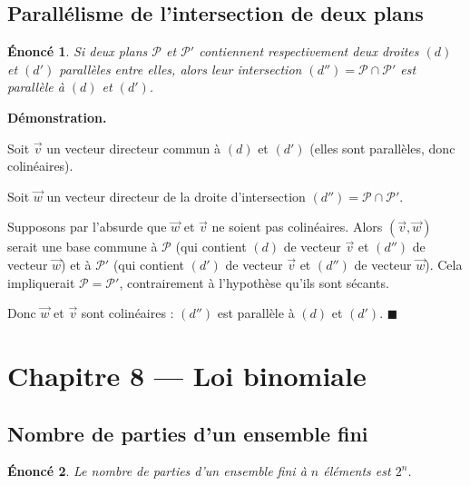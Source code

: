 \documentclass[11pt,a4paper]{article}
\newcommand{\vc}[1]{\overrightarrow{#1}}
\theoremstyle{enoncestyle}
\newtheorem{enonce}{Énoncé}[section]
\renewenvironment{proof}[1][\proofname]{%
  \par\medskip
  \noindent\textbf{\color{black!70}#1.}\quad\itshape
}{%
  \hfill$\blacksquare$\par\medskip
}
\begin{document}
\subsection{Parallélisme de l'intersection de deux plans}

\begin{mdframed}[linecolor=blue!40,backgroundcolor=blue!4,linewidth=1pt]
\begin{enonce}
Si deux plans $\mathcal{P}$ et $\mathcal{P}'$ contiennent respectivement deux droites
$(d)$ et $(d')$ parallèles entre elles, alors leur intersection
$(d'') = \mathcal{P} \cap \mathcal{P}'$ est parallèle à $(d)$ et $(d')$.
\end{enonce}
\end{mdframed}

\begin{proof}[Démonstration]
Soit $\vc{v}$ un vecteur directeur commun à $(d)$ et $(d')$ (elles sont parallèles, donc
colinéaires).

Soit $\vc{w}$ un vecteur directeur de la droite d'intersection
$(d'') = \mathcal{P} \cap \mathcal{P}'$.

Supposons par l'absurde que $\vc{w}$ et $\vc{v}$ ne soient pas colinéaires. Alors
$(\vc{v}, \vc{w})$ serait une base commune à $\mathcal{P}$ (qui contient $(d)$ de vecteur
$\vc{v}$ et $(d'')$ de vecteur $\vc{w}$) et à $\mathcal{P}'$ (qui contient $(d')$ de
vecteur $\vc{v}$ et $(d'')$ de vecteur $\vc{w}$). Cela impliquerait
$\mathcal{P} = \mathcal{P}'$, contrairement à l'hypothèse qu'ils sont sécants.

Donc $\vc{w}$ et $\vc{v}$ sont colinéaires : $(d'')$ est parallèle à $(d)$ et $(d')$.
\end{proof}

\section{Chapitre 8 — Loi binomiale}

\subsection{Nombre de parties d'un ensemble fini}

\begin{mdframed}[linecolor=blue!40,backgroundcolor=blue!4,linewidth=1pt]
\begin{enonce}
Le nombre de parties d'un ensemble fini à $n$ éléments est $2^n$.
\end{enonce}
\end{mdframed}
\end{document}
